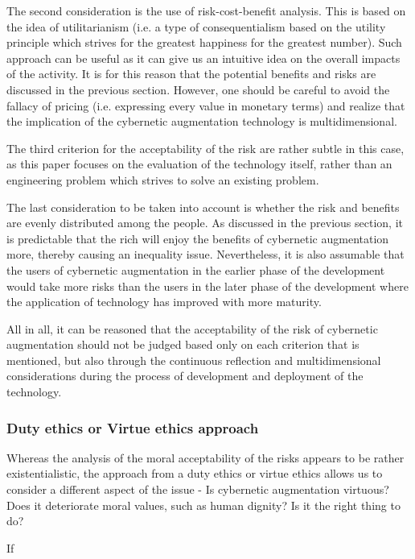 The second consideration is the use of risk-cost-benefit analysis. This is based on the idea of utilitarianism (i.e. a type of consequentialism based on the utility principle which strives for the greatest happiness for the greatest number). Such approach can be useful as it can give us an intuitive idea on the overall impacts of the activity. It is for this reason that the potential benefits and risks are discussed in the previous section. However, one should be careful to avoid the fallacy of pricing (i.e. expressing every value in monetary terms) and realize that the implication of the cybernetic augmentation technology is multidimensional.

The third criterion for the acceptability of the risk are rather subtle in this case, as this paper focuses on the evaluation of the technology itself, rather than an engineering problem which strives to solve an existing problem. 

The last consideration to be taken into account is whether the risk and benefits are evenly distributed among the people. As discussed in the previous section, it is predictable that the rich will enjoy the benefits of cybernetic augmentation more, thereby causing an inequality issue. Nevertheless, it is also assumable that the users of cybernetic augmentation in the earlier phase of the development would take more risks than the users  in the later phase of the development where the application of technology has improved with more maturity.

All in all, it can be reasoned that the acceptability of the risk of cybernetic augmentation should not be judged based only on each criterion that is mentioned, but also through the continuous reflection and multidimensional considerations during the process of development and deployment of the technology.

\subsubsection{Duty ethics or Virtue ethics approach}
Whereas the analysis of the moral acceptability of the risks appears to be rather existentialistic, the approach from a duty ethics or virtue ethics allows us to consider a different aspect of the issue - Is cybernetic augmentation virtuous? Does it deteriorate moral values, such as human dignity? Is it the right thing to do? 

If 


